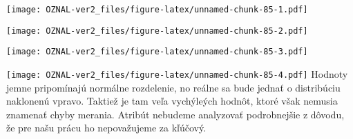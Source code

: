 \documentclass[
]{article}
\newenvironment{Shaded}{\begin{snugshade}}{\end{snugshade}}
\newcommand{\AttributeTok}[1]{\textcolor[rgb]{0.77,0.63,0.00}{#1}}
\newcommand{\FunctionTok}[1]{\textcolor[rgb]{0.00,0.00,0.00}{#1}}
\newcommand{\NormalTok}[1]{#1}
\newcommand{\SpecialCharTok}[1]{\textcolor[rgb]{0.00,0.00,0.00}{#1}}
\newcommand{\StringTok}[1]{\textcolor[rgb]{0.31,0.60,0.02}{#1}}
\begin{document}
\begin{Shaded}
\end{Shaded}

\texttt{[image: OZNAL-ver2\_files/figure-latex/unnamed-chunk-85-1.pdf]}

\begin{Shaded}
\end{Shaded}

\texttt{[image: OZNAL-ver2\_files/figure-latex/unnamed-chunk-85-2.pdf]}

\begin{Shaded}
\end{Shaded}

\texttt{[image: OZNAL-ver2\_files/figure-latex/unnamed-chunk-85-3.pdf]}

\begin{Shaded}
\end{Shaded}

\texttt{[image: OZNAL-ver2\_files/figure-latex/unnamed-chunk-85-4.pdf]}
Hodnoty jemne pripomínajú normálne rozdelenie, no reálne sa bude jednať
o distribúciu naklonenú vpravo. Taktiež je tam veľa vychýleých hodnôt,
ktoré však nemusia znamenať chyby merania. Atribút nebudeme analyzovať
podrobnejšie z dôvodu, že pre našu prácu ho nepovažujeme za kľúčový.
\end{document}
